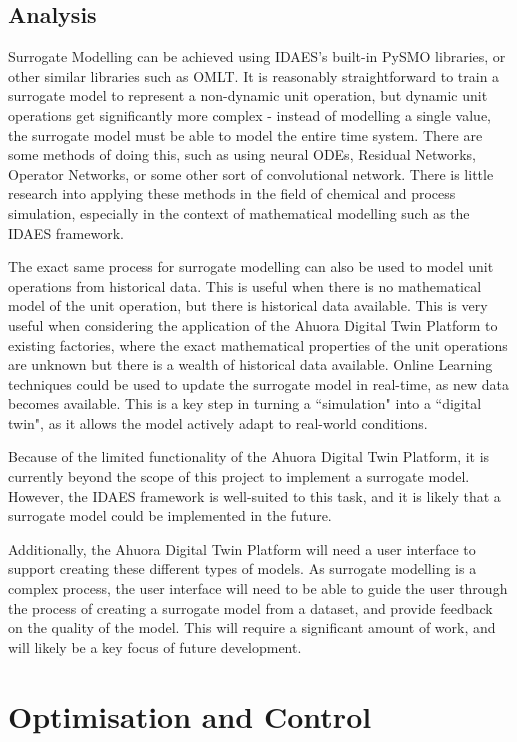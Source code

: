\subsection{Analysis}\label{sec:surrogatemodelling}

Surrogate Modelling can be achieved using IDAES's built-in PySMO libraries, or other similar libraries such as OMLT. It is reasonably straightforward to train a surrogate model to represent a non-dynamic unit operation, but dynamic unit operations get significantly more complex - instead of modelling a single value, the surrogate model must be able to model the entire time system. There are some methods of doing this, such as using neural ODEs, Residual Networks, Operator Networks, or some other sort of convolutional network. There is little research into applying these methods in the field of chemical and process simulation, especially in the context of mathematical modelling such as the IDAES framework.

The exact same process for surrogate modelling can also be used to model unit operations from historical data. This is useful when there is no mathematical model of the unit operation, but there is historical data available. This is very useful when considering the application of the Ahuora Digital Twin Platform to existing factories, where the exact mathematical properties of the unit operations are unknown but there is a wealth of historical data available. Online Learning techniques could be used to update the surrogate model in real-time, as new data becomes available. This is a key step in turning a ``simulation" into a ``digital twin", as it allows the model actively adapt to real-world conditions.

Because of the limited functionality of the Ahuora Digital Twin Platform, it is currently beyond the scope of this project to implement a surrogate model. However, the IDAES framework is well-suited to this task, and it is likely that a surrogate model could be implemented in the future.

Additionally, the Ahuora Digital Twin Platform will need a user interface to support creating these different types of models. As surrogate modelling is a complex process, the user interface will need to be able to guide the user through the process of creating a surrogate model from a dataset, and provide feedback on the quality of the model. This will require a significant amount of work, and will likely be a key focus of future development.


\section{Optimisation and Control}

